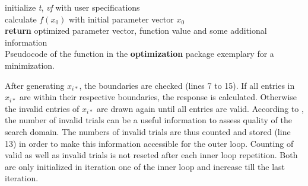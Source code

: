 \SetAlCapSkip{2ex}
\begin{algorithm}[H]
	initialize \textit{t}, \textit{vf} with user specifications\\
	calculate $f(x_0)$ with initial parameter vector $x_0$\\
	\textbf{return} optimized parameter vector, function value and some additional information \\
	\caption{Pseudocode of the  function in the \textbf{optimization} package exemplary for a minimization.}
	\label{alg:alg1}
\end{algorithm}

After generating $x_{i*}$, the boundaries are checked (lines 7 to 15). If all entries in $x_{i*}$ are within their respective boundaries, the response is calculated. Otherwise the invalid entries of $x_{i*}$ are drawn again until all entries are valid. According to \citet{corana_1987}, the number of invalid trials can be a useful information to assess quality of the search domain. The numbers of invalid trials are thus counted and stored (line 13) in order to make this information accessible for the outer loop. Counting of valid as well as invalid trials is not reseted after each inner loop repetition. Both are only initialized in iteration one of the inner loop and increase till the last iteration.

